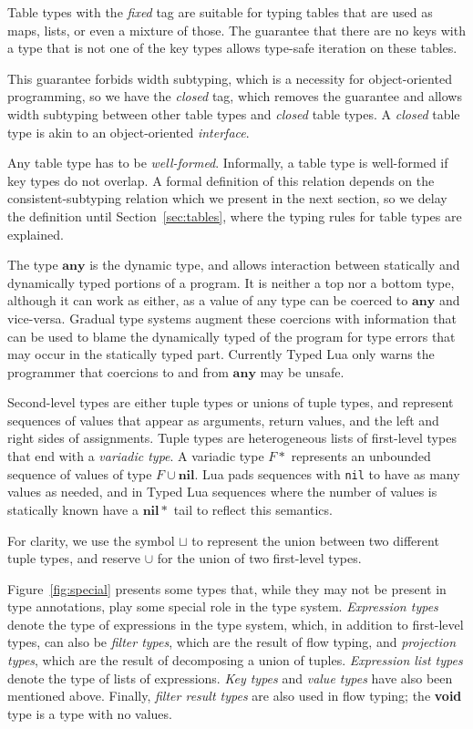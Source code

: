 \documentclass[preprint]{sigplanconf}
\newcommand{\Any}{\mathbf{any}}
\newcommand{\Nil}{\mathbf{nil}}
\begin{document}
Table types with the {\em fixed} tag are suitable for typing tables that are used as maps, lists, or even a mixture of those. The guarantee that there are no keys with a type that is not
one of the key types allows type-safe iteration on these
tables.

This guarantee forbids width subtyping, which is a necessity
for object-oriented programming, so we have the {\em closed}
tag, which removes the guarantee and allows width subtyping
between other table types and {\em closed} table types. A {\em closed} table type is akin to an object-oriented {\em interface}.

Any table type has to be \emph{well-formed}.
Informally, a table type is well-formed if key types do not overlap. A formal definition of this relation depends on
the consistent-subtyping relation which we present in the
next section, so we delay the definition until Section~\ref{sec:tables}, where the typing rules for
table types are explained.

The type $\Any$ is the dynamic type, and allows
interaction between statically and dynamically typed
portions of a program. It is neither a top nor a bottom
type, although it can work as either, as a value of
any type can be coerced to $\Any$ and vice-versa.
Gradual type systems augment these coercions with
information that can be used to blame the dynamically
typed of the program for type errors that may occur in the
statically typed part. Currently Typed Lua only 
warns the programmer that coercions to and from $\Any$
may be unsafe.

Second-level types are either tuple types or unions of tuple types, and represent sequences of values that appear as arguments, return values, and the left and right sides of
assignments. Tuple types are heterogeneous lists of first-level
types that end with a {\em variadic type}.
A variadic type $F{*}$ represents an unbounded sequence of values of type $F \cup \Nil$. Lua pads sequences with {\tt nil} to
have as many values as needed, and in Typed Lua sequences
where the number of values is statically known have a $\Nil{*}$
tail to reflect this semantics.

For clarity, we use the symbol $\sqcup$ to represent the union between two different tuple types, and reserve $\cup$ for the
union of two first-level types.

Figure~\ref{fig:special} presents some types that, while
they may not be present in type annotations, play some
special role in the type system. {\em Expression types}
denote the type of expressions in the type system, which,
in addition to first-level types, can also be
{\em filter types}, which are the result of flow typing,
and {\em projection types}, which are the result of
decomposing a union of tuples. {\em Expression list types}
denote the type of lists of expressions. {\em Key types}
and {\em value types} have also been mentioned above. Finally, {\em filter result types}
are also used in flow typing; the {\bf void} type is
a type with no values.
\end{document}
